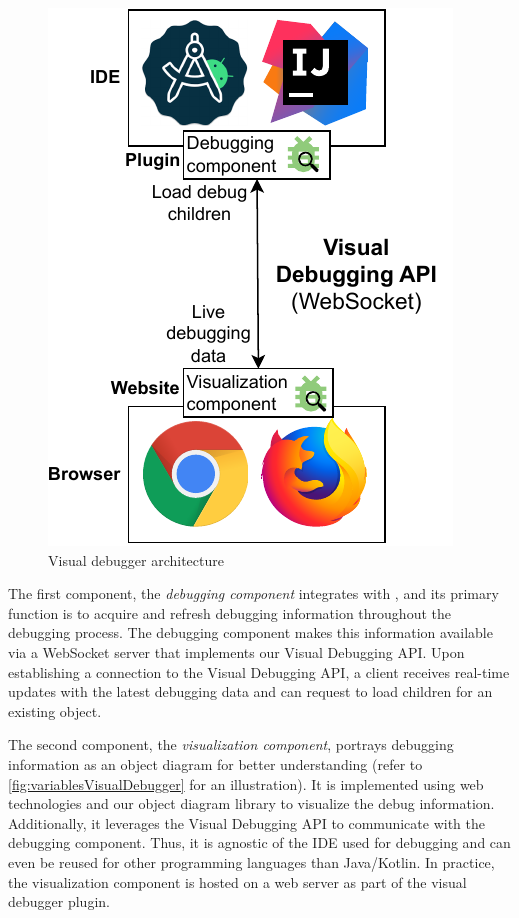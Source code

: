 \documentclass[sigconf]{acmart}
\begin{document}
\begin{figure}[ht]
  \centering
  \includegraphics[width=0.8\linewidth]{images/visual-debugger-architecture.pdf}
  \caption{Visual debugger architecture}
  \label{fig:architecture}
\end{figure}

The first component, the \textit{debugging component} integrates with \intellij{}, and its primary function is to acquire and refresh debugging information throughout the debugging process.
The debugging component makes this information available via a WebSocket server that implements our Visual Debugging API.
Upon establishing a connection to the Visual Debugging API, a client receives real-time updates with the latest debugging data and can request to load children for an existing object.

The second component, the \textit{visualization component}, portrays debugging information as an object diagram for better understanding (refer to \autoref{fig:variablesVisualDebugger} for an illustration).
It is implemented using web technologies and our object diagram library \cite{timkrauterObjectdiagramjs2023} to visualize the debug information.
Additionally, it leverages the Visual Debugging API to communicate with the debugging component.
Thus, it is agnostic of the IDE used for debugging and can even be reused for other programming languages than Java/Kotlin.
In practice, the visualization component is hosted on a web server as part of the visual debugger plugin.
\end{document}
